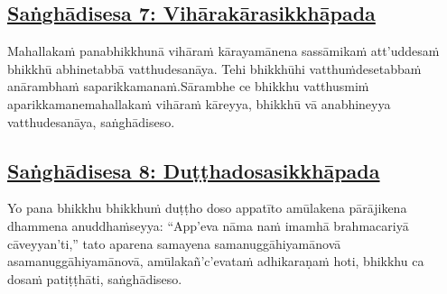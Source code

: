 \subsection*{\hyperref[comm7]{Saṅghādisesa 7: Vihārakārasikkhāpada}}
\label{sd7}

Mahallakaṁ pana\makeatletter\hyperlink{endnote55-appendix}\makeatother \thinspace bhikkhunā vihāraṁ kārayamānena sassāmikaṁ att'uddesaṁ bhikkhū abhinetabbā vatthudesanāya. Tehi bhikkhūhi vatthuṁ\makeatletter\hyperlink{endnote56-appendix}\makeatother \thinspace desetabbaṁ anārambhaṁ saparikkamanaṁ.\makeatletter\hyperlink{endnote57-appendix}\makeatother \thinspace Sārambhe ce bhikkhu vatthusmiṁ aparikkamane\makeatletter\hyperlink{endnote58-appendix}\makeatother \thinspace mahallakaṁ vihāraṁ kāreyya, bhikkhū vā anabhineyya vatthudesanāya, saṅghādiseso.



\subsection*{\hyperref[comm8]{Saṅghādisesa 8: Duṭṭhadosasikkhāpada}}
\label{sd8}

Yo pana bhikkhu bhikkhuṁ duṭṭho doso appatīto amūlakena pārājikena dhammena anuddhaṁseyya: ``App'eva nāma naṁ imamhā brahmacariyā cāveyyan'ti,'' tato aparena samayena samanuggāhiyamāno\makeatletter\hyperlink{endnote59-appendix}\makeatother \thinspace vā asamanuggāhiyamāno\makeatletter\hyperlink{endnote60-appendix}\makeatother \thinspace vā, amūlakañ'c'eva\makeatletter\hyperlink{endnote-appendix}\makeatother \thinspace taṁ adhikaraṇaṁ hoti, bhikkhu ca dosaṁ patiṭṭhāti, saṅghādiseso.



